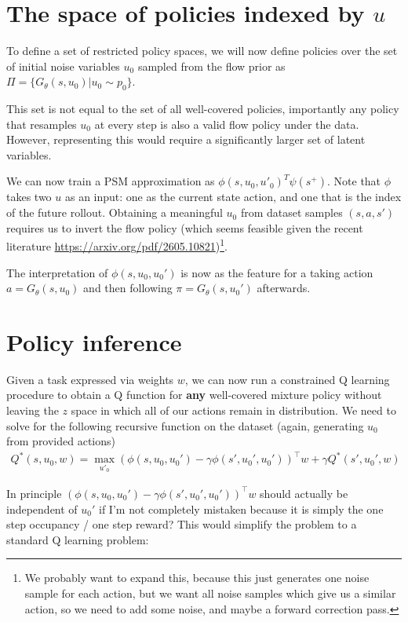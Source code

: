 \section{The space of policies indexed by $u$}

To define a set of restricted policy spaces, we will now define policies over the set of initial noise variables $u_0$ sampled from the flow prior as $\Pi = \{G_\theta(s,u_0)|u_0 \sim p_0\}$.

This set is not equal to the set of all well-covered policies, importantly any policy that resamples $u_0$ at every step is also a valid flow policy under the data.
However, representing this would require a significantly larger set of latent variables.

We can now train a PSM approximation as $\phi(s,u_0,u'_0)^T\psi(s^+)$. Note that $\phi$ takes two $u$ as an input: one as the current state action, and one that is the index of the future rollout.
Obtaining a meaningful $u_0$ from dataset samples $(s,a,s')$ requires us to invert the flow policy (which seems feasible given the recent literature \url{https://arxiv.org/pdf/2605.10821})\footnote{We probably want to expand this, because this just generates one noise sample for each action, but we want all noise samples which give us a similar action, so we need to add some noise, and maybe a forward correction pass.}.

The interpretation of $\phi(s,u_0,u_0')$ is now as the feature for a taking action $a=G_\theta(s,u_0)$ and then following $\pi = G_\theta(s,u_0')$ afterwards.

\section{Policy inference}

Given a task expressed via weights $w$, we can now run a constrained Q learning procedure to obtain a Q function for \textbf{any} well-covered mixture policy without leaving the $z$ space in which all of our actions remain in distribution.
We need to solve for the following recursive function on the dataset (again, generating $u_0$ from provided actions)
\begin{align}
    Q^*(s,u_0,w) = \max_{u'_0} \left(\phi(s,u_0,u_0') - \gamma \phi(s',u_0',u_0')\right)^\top w + \gamma Q^*(s',u_0',w)
\end{align}

In principle $\left(\phi(s,u_0,u_0') - \gamma \phi(s',u_0',u_0')\right)^\top w$ should actually be independent of $u_0'$ if I'm not completely mistaken because it is simply the one step occupancy / one step reward? This would simplify the problem to a standard Q learning problem:

